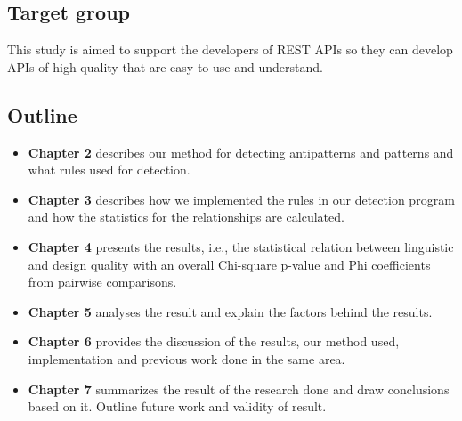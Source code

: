 \subsection{Target group}
This study is aimed to support the developers of REST APIs so they can develop APIs of high quality that are easy to use and understand. 

\subsection{Outline}

\begin{itemize}
\item \textbf{Chapter 2} describes our method for detecting antipatterns and patterns and what rules used for detection.
\item \textbf{Chapter 3} describes how we implemented the rules in our detection program and how the statistics for the relationships are calculated.
\item \textbf{Chapter 4} presents the results, i.e., the statistical relation between linguistic and design quality with an overall Chi-square p-value and Phi coefficients from pairwise comparisons.
\item \textbf{Chapter 5} analyses the result and explain the factors behind the results.
\item \textbf{Chapter 6} provides the discussion of the results, our method used, implementation and previous work done in the same area.
\item \textbf{Chapter 7} summarizes the result of the research done and draw conclusions based on it. Outline future work and validity of result.
\end{itemize}

\newpage